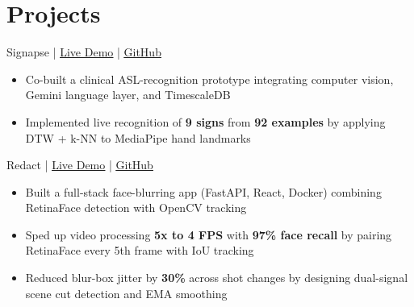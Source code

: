 \documentclass[11pt]{article}       %
\newcommand{\textsb}[1]{{\fontseries{sb}\selectfont #1}}
\begin{document}


\section*{Projects}

\textsb{Signapse} | \href{https://signapse.health}{\underline{Live Demo}} | \href{https://github.com/emilyyuuu/Signapse}{\underline{GitHub}}
\begin{itemize}
    \item Co-built a clinical ASL-recognition prototype integrating computer vision, Gemini language layer, and TimescaleDB
    \item Implemented live recognition of \textbf{9 signs} from \textbf{92 examples} by applying DTW + k-NN to MediaPipe hand landmarks
\end{itemize}

\vspace{6pt}

\textsb{Redact} | \href{https://redact.sunnoah.ca}{\underline{Live Demo}} | \href{https://github.com/LegendaryArk/Redact}{\underline{GitHub}}
\begin{itemize}
    \item Built a full-stack face-blurring app (FastAPI, React, Docker) combining RetinaFace detection with OpenCV tracking
    \item Sped up video processing \textbf{5x to 4 FPS} with \textbf{97\% face recall} by pairing RetinaFace every 5th frame with IoU tracking
    \item Reduced blur-box jitter by \textbf{30\%} across shot changes by designing dual-signal scene cut detection and EMA smoothing
\end{itemize}
\end{document}
